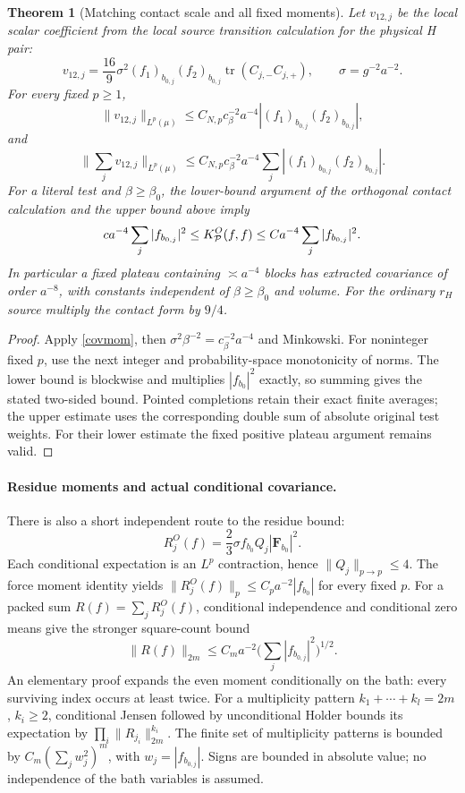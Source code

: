 \documentclass[11pt]{article}
\newtheorem{theorem}{Theorem}
\begin{document}
\begin{theorem}[Matching contact scale and all fixed moments]
Let $v_{12,j}$ be the local scalar coefficient from the local source transition calculation for the physical H pair:
\[
 v_{12,j}=\frac{16}{9}\sigma^2(f_1)_{b_{0,j}}(f_2)_{b_{0,j}}
               \operatorname{tr}(C_{j,-}C_{j,+}),\qquad \sigma=g^{-2}a^{-2}.
\]
For every fixed $p\ge1$,
\[
 \|v_{12,j}\|_{L^p(\mu)}\le C_{N,p}c_\beta^{-2}a^{-4}
 |(f_1)_{b_{0,j}}(f_2)_{b_{0,j}}|,
\]
and
\[
 \Big\|\sum_jv_{12,j}\Big\|_{L^p(\mu)}
 \le C_{N,p}c_\beta^{-2}a^{-4}
 \sum_j|(f_1)_{b_{0,j}}(f_2)_{b_{0,j}}|.
\]
For a literal test and $\beta\ge\beta_0$, the lower-bound argument of the orthogonal contact calculation and
the upper bound above imply
\[
 ca^{-4}\sum_j|f_{b_{0,j}}|^2
 \le K_{\cal P}^{O}(f,f)\le Ca^{-4}\sum_j|f_{b_{0,j}}|^2.
\]
In particular a fixed plateau containing $\asymp a^{-4}$ blocks has extracted covariance
of order $a^{-8}$, with constants independent of $\beta\ge\beta_0$ and volume.
For the ordinary $r_H$ source multiply the contact form by $9/4$.
\end{theorem}
\begin{proof}
Apply \eqref{covmom}, then $\sigma^2\beta^{-2}=c_\beta^{-2}a^{-4}$ and Minkowski.
For noninteger fixed $p$, use the next integer and probability-space monotonicity of norms.
The lower bound is blockwise and multiplies $|f_{b_0}|^2$ exactly, so summing gives the
stated two-sided bound. Pointed completions retain their exact finite averages;
the upper estimate uses the corresponding double sum of absolute original test weights.
For their lower estimate the fixed positive plateau argument remains valid.
\end{proof}

\paragraph{Residue moments and actual conditional covariance.}
There is also a short independent route to the residue bound:
\[
 R_j^O(f)=\frac23\sigma f_{b_0}Q_j|\mathbf F_{b_0}|^2.
\]
Each conditional expectation is an $L^p$ contraction, hence $\|Q_j\|_{p\to p}\le4$.
The force moment identity yields
$\|R_j^O(f)\|_p\le C_p a^{-2}|f_{b_0}|$ for every fixed $p$.
For a packed sum $R(f)=\sum_jR_j^O(f)$, conditional independence and conditional zero
means give the stronger square-count bound
\begin{equation}\label{resmom}
 \|R(f)\|_{2m}\le C_m a^{-2}\Big(\sum_j|f_{b_{0,j}}|^2\Big)^{1/2}.
\end{equation}
An elementary proof expands the even moment conditionally on the bath: every surviving
index occurs at least twice. For a multiplicity pattern $k_1+\cdots+k_l=2m$, $k_i\ge2$,
conditional Jensen followed by unconditional Holder bounds its expectation by
$\prod_i\|R_{j_i}\|_{2m}^{k_i}$. The finite set of multiplicity patterns is bounded by
$C_m(\sum_j w_j^2)^m$, with $w_j=|f_{b_{0,j}}|$. Signs are bounded in absolute value;
no independence of the bath variables is assumed.
\end{document}
